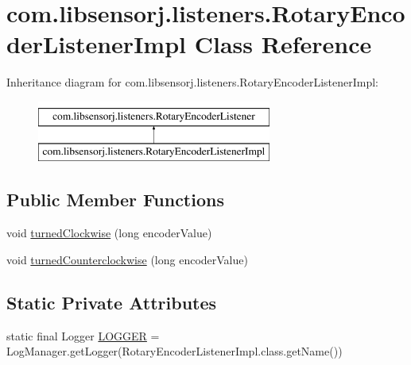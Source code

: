 \hypertarget{classcom_1_1libsensorj_1_1listeners_1_1RotaryEncoderListenerImpl}{}\section{com.\+libsensorj.\+listeners.\+Rotary\+Encoder\+Listener\+Impl Class Reference}
\label{classcom_1_1libsensorj_1_1listeners_1_1RotaryEncoderListenerImpl}
Inheritance diagram for com.\+libsensorj.\+listeners.\+Rotary\+Encoder\+Listener\+Impl\+:\begin{figure}[H]
\begin{center}
\leavevmode
\includegraphics[height=2.000000cm]{classcom_1_1libsensorj_1_1listeners_1_1RotaryEncoderListenerImpl}
\end{center}
\end{figure}
\subsection*{Public Member Functions}
\begin{DoxyCompactItemize}
\item 
void \hyperlink{classcom_1_1libsensorj_1_1listeners_1_1RotaryEncoderListenerImpl_a3dbffe8a20820933fc5910d0aecf5212}{turned\+Clockwise} (long encoder\+Value)
\item 
void \hyperlink{classcom_1_1libsensorj_1_1listeners_1_1RotaryEncoderListenerImpl_a7c07901b6fbfe89c7406afa8fcf4d482}{turned\+Counterclockwise} (long encoder\+Value)
\end{DoxyCompactItemize}
\subsection*{Static Private Attributes}
\begin{DoxyCompactItemize}
\item 
static final Logger \hyperlink{classcom_1_1libsensorj_1_1listeners_1_1RotaryEncoderListenerImpl_af88de2de8fdc7d0d31d454648560aa41}{L\+O\+G\+G\+E\+R} = Log\+Manager.\+get\+Logger(Rotary\+Encoder\+Listener\+Impl.\+class.\+get\+Name())
\end{DoxyCompactItemize}


